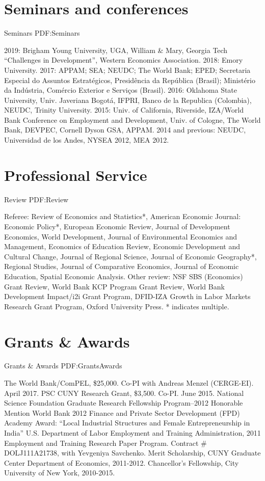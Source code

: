 \documentclass[letterpaper,10pt,oneside]{article}
\begin{document}
\begin{body}
\section
{Seminars and conferences}
{Seminars}
{PDF:Seminars}
\par
2019: Brigham Young University, UGA, William \& Mary, Georgia Tech ``Challenges in Development'', Western Economics Association. 2018: Emory University. 2017: APPAM; SEA; NEUDC; The World Bank; EPED; Secretaria Especial do Assuntos Estrat\'{e}gicos, Presid\^{e}ncia da Rep\'{u}blica (Brasil); Minist\'{e}rio da Ind\'{u}stria, Com\'{e}rcio Exterior e Servi\c{c}os (Brasil). 2016: Oklahoma State University, Univ. Javeriana Bogot\'{a}, IFPRI, Banco de la Republica (Colombia), NEUDC, Trinity University. 2015: Univ. of California, Riverside, IZA/World Bank Conference on Employment and Development, Univ. of Cologne, The World Bank, DEVPEC, Cornell Dyson GSA, APPAM. 2014 and previous: NEUDC, Universidad de los Andes, NYSEA 2012, MEA 2012.

\section
{Professional Service}
{Review}
{PDF:Review}
\par Referee: Review of Economics and Statistics*, American Economic Journal: Economic Policy*, European Economic Review, Journal of Development Economics, World Development, Journal of Environmental Economics and Management, Economics of Education Review, Economic Development and Cultural Change, Journal of Regional Science, Journal of Economic Geography*, Regional Studies, Journal of Comparative Economics, Journal of Economic Education, Spatial Economic Analysis. Other review: NSF SBS (Economics) Grant Review, World Bank KCP Program Grant Review, World Bank Development Impact/i2i Grant Program, DFID-IZA Growth in Labor Markets Research Grant Program, Oxford University Press. * indicates multiple.

\section
{Grants\newline
\& Awards}
{Grants \& Awards}
{PDF:GrantsAwards}
\par
\BulletItem
The World Bank/ComPEL, \$25,000. Co-PI with Andreas Menzel (CERGE-EI). April 2017.
\BulletItem
PSC CUNY Research Grant, \$3,500. Co-PI. June 2015.
\BulletItem
National Science Foundation Graduate Research Fellowship Program--2012 Honorable Mention
\BulletItem
World Bank 2012 Finance and Private Sector Development (FPD) Academy Award: ``Local Industrial Structures and Female Entrepreneurship in India''
\BulletItem
U.S. Department of Labor Employment and Training Administration, 2011 Employment and Training Research Paper Program. Contract \# DOLJ111A21738, with Yevgeniya Savchenko.
\BulletItem
Merit Scholarship, CUNY Graduate Center Department of Economics, 2011-2012.
\BulletItem
Chancellor's Fellowship, City University of New York, 2010-2015.


\end{body}
\end{document}

